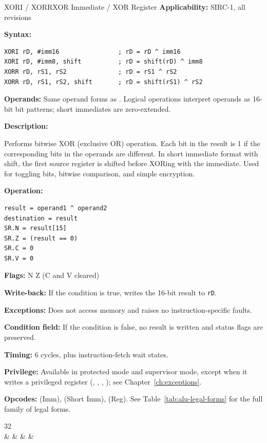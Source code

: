 \begin{instructionbox}{XORI / XORR}{XOR Immediate / XOR Register}
	\textbf{Applicability:} SIRC-1, all revisions

	\textbf{Syntax:}
	\begin{lstlisting}
XORI rD, #imm16                ; rD = rD ^ imm16
XORI rD, #imm8, shift          ; rD = shift(rD) ^ imm8
XORR rD, rS1, rS2              ; rD = rS1 ^ rS2
XORR rD, rS1, rS2, shift       ; rD = shift(rS1) ^ rS2
\end{lstlisting}

	\textbf{Operands:} Same operand forms as . Logical operations interpret operands as 16-bit bit
	patterns; short immediates are zero-extended.

	\textbf{Description:}

	Performs bitwise XOR (exclusive OR) operation. Each bit in the result is 1 if the corresponding bits in the operands
	are different. In short immediate format with shift, the first source register is shifted before XORing with the
	immediate. Used for toggling bits, bitwise comparison, and simple encryption.

	\textbf{Operation:}
	\begin{verbatim}
result = operand1 ^ operand2
destination = result
SR.N = result[15]
SR.Z = (result == 0)
SR.C = 0
SR.V = 0
\end{verbatim}

	\textbf{Flags:} N Z (C and V cleared)

	\textbf{Write-back:} If the condition is true, writes the 16-bit result to \texttt{rD}.

	\textbf{Exceptions:} Does not access memory and raises no instruction-specific faults.

	\textbf{Condition field:} If the condition is false, no result is written and status flags are preserved.

	\textbf{Timing:} 6 cycles, plus instruction-fetch wait states.

	\textbf{Privilege:} Available in protected mode and supervisor mode, except when it writes a
	privileged register (, , , ); see Chapter~\ref{ch:exceptions}.

	\textbf{Opcodes:}  (Imm),  (Short Imm),  (Reg). See Table~\ref{tab:alu-legal-forms} for the full family of legal forms.

	\begin{center}
		\begin{bytefield}[bitwidth=1.1em]{32}
			 \\
			 &
			 &
			 &
			 &
		\end{bytefield}
	\end{center}


\end{instructionbox}
